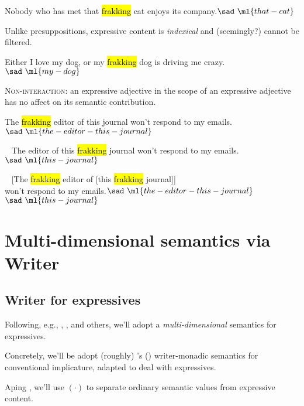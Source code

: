 \documentclass[nols,twoside,nofonts,nobib,nohyper]{tufte-handout}
\begin{document}
\ex
Nobody who has met that \hl{frakking} cat enjoys its company.\hfill$\sad \ml{that-cat}$
\xe

Unlike presuppositions, expressive content is \textit{indexical} and (seemingly?) cannot be filtered.

\ex
Either I love my dog, or my \hl{frakking} dog is driving me crazy.\\
\phantom{,}\hfill$\sad \ml{my-dog}$
\xe

\textsc{Non-interaction:} an expressive adjective in the scope of an expressive adjective has no affect on its semantic contribution.

\ex
The \hl{frakking} editor of this journal won't respond to my emails.\\
\phantom{,}\hfill$\sad \ml{the-editor-this-journal}$
\xe

\ex~
The editor of this \hl{frakking} journal won't respond to my emails.\\
\phantom{,}\hfill$\sad \ml{this-journal}$
\xe

\ex~
{}[The \hl{frakking} editor of [this \hl{frakking} journal]]\\
won't respond to my emails.\hfill$\sad \ml{the-editor-this-journal}$\\
\phantom{,}\hfill$\sad \ml{this-journal}$\\
\xe

\section{Multi-dimensional semantics via Writer}

\subsection{Writer for expressives}

Following, e.g., \cite{potts2005}, \cite{mccready2010a}, and others, we'll adopt a \textit{multi-dimensional} semantics for expressives.

Concretely, we'll be adopt (roughly) \citeauthor{asudehGiorgolo2012}'s (\citeyear{asudehGiorgolo2012}) writer-monadic semantics for conventional implicature, adapted to deal with expressives.

Aping \citeauthor{potts2005}, we'll use $(·)$ to separate ordinary semantic values from expressive content.
\end{document}

